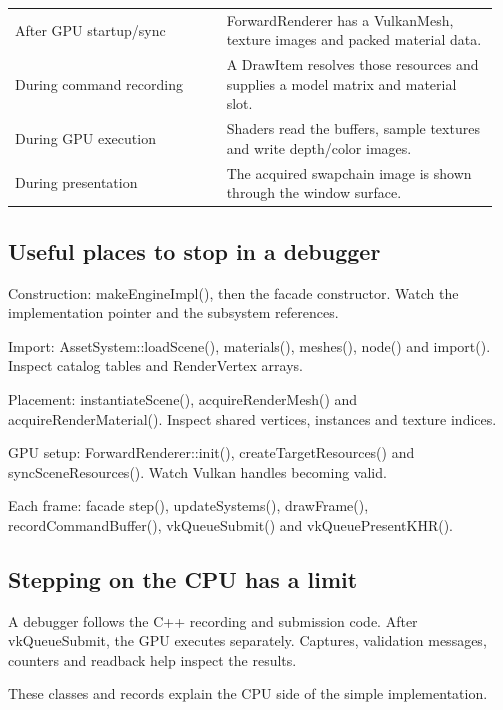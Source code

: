 \documentclass[11pt,a4paper]{article}
\begin{document}
{\small
\begin{longtable}{@{}p{0.42\linewidth}p{0.54\linewidth}@{}}
After GPU startup/sync & ForwardRenderer has a VulkanMesh, texture images and packed material data. \\
During command recording & A DrawItem resolves those resources and supplies a model matrix and material slot. \\
During GPU execution & Shaders read the buffers, sample textures and write depth/color images. \\
During presentation & The acquired swapchain image is shown through the window surface. \\
\end{longtable}
}

\subsection*{Useful places to stop in a debugger}
Construction: makeEngineImpl(), then the facade constructor. Watch the implementation pointer and the subsystem references.

Import: AssetSystem::loadScene(), materials(), meshes(), node() and import(). Inspect catalog tables and RenderVertex arrays.

Placement: instantiateScene(), acquireRenderMesh() and acquireRenderMaterial(). Inspect shared vertices, instances and texture indices.

GPU setup: ForwardRenderer::init(), createTargetResources() and syncSceneResources(). Watch Vulkan handles becoming valid.

Each frame: facade step(), updateSystems(), drawFrame(), recordCommandBuffer(), vkQueueSubmit() and vkQueuePresentKHR().

\subsection*{Stepping on the CPU has a limit}
A debugger follows the C++ recording and submission code. After vkQueueSubmit, the GPU executes separately. Captures, validation messages, counters and readback help inspect the results.

\label{core-48}
These classes and records explain the CPU side of the simple implementation.
\end{document}
